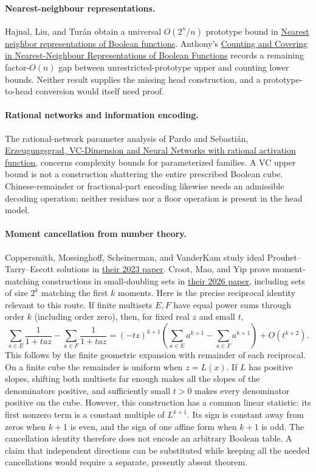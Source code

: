 \documentclass[11pt]{article}
\begin{document}
\paragraph{Nearest-neighbour representations.}
Hajnal, Liu, and Tur\'an obtain a universal $O(2^n/n)$ prototype bound in
\href{https://arxiv.org/abs/2004.01741}{Nearest neighbor representations
of Boolean functions}. Anthony's
\href{https://arxiv.org/abs/2609.23094}{Counting and Covering in
Nearest-Neighbour Representations of Boolean Functions} records a
remaining factor-$O(n)$ gap between unrestricted-prototype upper and
counting lower bounds. Neither result supplies the missing head
construction, and a prototype-to-head conversion would itself need proof.

\paragraph{Rational networks and information encoding.}
The rational-network parameter analysis of Pardo and Sebasti\'an,
\href{https://arxiv.org/abs/2504.11345}{Erzeugungsgrad, VC-Dimension and
Neural Networks with rational activation function}, concerns complexity
bounds for parameterized families. A VC upper bound is not a construction
shattering the entire prescribed Boolean cube. Chinese-remainder or
fractional-part encoding likewise needs an admissible decoding operation;
neither residues nor a floor operation is present in the head model.

\paragraph{Moment cancellation from number theory.}
Coppersmith, Mossinghoff, Scheinerman, and VanderKam study ideal
Prouhet--Tarry--Escott solutions in
\href{https://arxiv.org/abs/2304.11254}{their 2023 paper}.
Croot, Mao, and Yip prove moment-matching constructions in small-doubling
sets in \href{https://arxiv.org/abs/2609.05061}{their 2026 paper},
including sets of size $2^k$ matching the first $k$ moments.
Here is the precise reciprocal identity relevant to this route.
If finite multisets $E,F$ have equal power sums through order $k$
(including order zero), then, for fixed real $z$ and small $t$,
\[
 \sum_{a\in E}\frac{1}{1+taz}-\sum_{a\in F}\frac{1}{1+taz}
 =(-tz)^{k+1}\left(\sum_{a\in E}a^{k+1}
                 -\sum_{a\in F}a^{k+1}\right)+O(t^{k+2}).
\]
This follows by the finite geometric expansion with remainder of each
reciprocal. On a finite cube the remainder is uniform when $z=L(x)$.
If $L$ has positive slopes, shifting both multisets far enough makes all
the slopes of the denominators positive, and sufficiently small $t>0$
makes every denominator positive on the cube. However, this construction
has a common linear statistic: its first nonzero term is a constant
multiple of $L^{k+1}$. Its sign is constant away from zeros when $k+1$ is
even, and the sign of one affine form when $k+1$ is odd. The cancellation
identity therefore does not encode an arbitrary Boolean table. A claim
that independent directions can be substituted while keeping all the
needed cancellations would require a separate, presently absent theorem.
\end{document}
